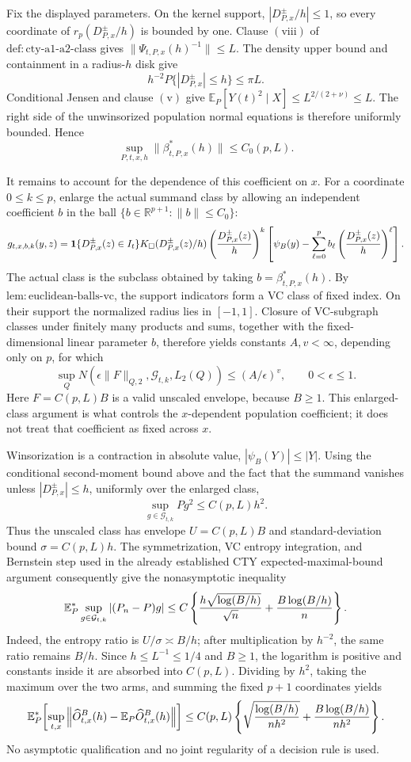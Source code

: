 Fix the displayed parameters.  On the kernel support, \(|D^{\pm}_{P,x}/h|\leq1\), so every coordinate of \(r_p(D^{\pm}_{P,x}/h)\) is bounded by one.  Clause \(\mathrm{(viii)}\) of \(\mathrm{def:cty\text{-}a1\text{-}a2\text{-}class}\) gives \(\|\Psi_{t,P,x}(h)^{-1}\|\leq L\).  The density upper bound and containment in a radius-\(h\) disk give
\[
 h^{-2}P\{|D^{\pm}_{P,x}|\leq h\}\leq \pi L.
\]
Conditional Jensen and clause \(\mathrm{(v)}\) give \(\mathbb E_P[Y(t)^2\mid X]\leq L^{2/(2+\nu)}\leq L\).  The right side of the unwinsorized population normal equations is therefore uniformly bounded.  Hence
\[
 \sup_{P,t,x,h}\|\beta^*_{t,P,x}(h)\|\leq C_0(p,L).
\]

It remains to account for the dependence of this coefficient on \(x\).  For a coordinate \(0\leq k\leq p\), enlarge the actual summand class by allowing an independent coefficient \(b\) in the ball \(\{b\in\mathbb R^{p+1}:\|b\|\leq C_0\}\):
\[
 g_{t,x,b,k}(y,z)=\mathbf1\{D^{\pm}_{P,x}(z)\in I_t\}K_\square(D^{\pm}_{P,x}(z)/h)
 \left({D^{\pm}_{P,x}(z)\over h}\right)^k
 \left[\psi_B(y)-\sum_{\ell=0}^p b_\ell
 \left({D^{\pm}_{P,x}(z)\over h}\right)^\ell\right].
\]
The actual class is the subclass obtained by taking \(b=\beta^*_{t,P,x}(h)\).  By \(\mathrm{lem:euclidean\text{-}balls\text{-}vc}\), the support indicators form a VC class of fixed index.  On their support the normalized radius lies in \([-1,1]\).  Closure of VC-subgraph classes under finitely many products and sums, together with the fixed-dimensional linear parameter \(b\), therefore yields constants \(A,v<\infty\), depending only on \(p\), for which
\[
 \sup_Q N\!\left(\epsilon\|F\|_{Q,2},\mathcal G_{t,k},L_2(Q)\right)
 \leq (A/\epsilon)^v,\qquad 0<\epsilon\leq1.
\]
Here \(F=C(p,L)B\) is a valid unscaled envelope, because \(B\geq1\).  This enlarged-class argument is what controls the \(x\)-dependent population coefficient; it does not treat that coefficient as fixed across \(x\).

Winsorization is a contraction in absolute value, \(|\psi_B(Y)|\leq|Y|\).  Using the conditional second-moment bound above and the fact that the summand vanishes unless \(|D^{\pm}_{P,x}|\leq h\), uniformly over the enlarged class,
\[
 \sup_{g\in\mathcal G_{t,k}}P g^2\leq C(p,L)h^2.
\]
Thus the unscaled class has envelope \(U=C(p,L)B\) and standard-deviation bound \(\sigma=C(p,L)h\).  The symmetrization, VC entropy integration, and Bernstein step used in the already established CTY expected-maximal-bound argument consequently give the nonasymptotic inequality
\[
 \mathbb E_P^*\sup_{g\in\mathcal G_{t,k}}|(P_n-P)g|
 \leq C\left\{
 {h\sqrt{\log(B/h)}\over\sqrt n}
 +{B\log(B/h)\over n}
 \right\}.
\]
Indeed, the entropy ratio is \(U/\sigma\asymp B/h\); after multiplication by \(h^{-2}\), the same ratio remains \(B/h\).  Since \(h\leq L^{-1}\leq1/4\) and \(B\geq1\), the logarithm is positive and constants inside it are absorbed into \(C(p,L)\).  Dividing by \(h^2\), taking the maximum over the two arms, and summing the fixed \(p+1\) coordinates yields
\[
 \mathbb E_P^*\!\left[
 \sup_{t,x}\left\|\widehat O^B_{t,x}(h)-\mathbb E_P\widehat O^B_{t,x}(h)\right\|
 \right]
 \leq C(p,L)\left\{
 \sqrt{{\log(B/h)\over nh^2}}+{B\log(B/h)\over nh^2}
 \right\}.
\]
No asymptotic qualification and no joint regularity of a decision rule is used.